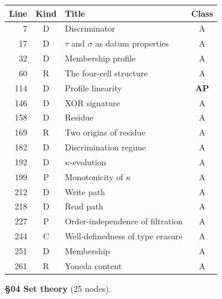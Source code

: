 \begin{center}
\scriptsize
\begin{tabular}{r|c|l|c}
\textbf{Line} & \textbf{Kind} & \textbf{Title} & \textbf{Class} \\
\hline
7 & \textsf{D} & Discriminator & A \\
17 & \textsf{D} & $\tau$ and $\sigma$ as datum properties & A \\
32 & \textsf{D} & Membership profile & A \\
60 & \textsf{R} & The four-cell structure & A \\
114 & \textsf{D} & Profile linearity & \textbf{AP} \\
146 & \textsf{D} & XOR signature & A \\
158 & \textsf{D} & Residue & A \\
169 & \textsf{R} & Two origins of residue & A \\
182 & \textsf{D} & Discrimination regime & A \\
192 & \textsf{D} & $\kappa$-evolution & A \\
199 & \textsf{P} & Monotonicity of $\kappa$ & A \\
212 & \textsf{D} & Write path & A \\
218 & \textsf{D} & Read path & A \\
227 & \textsf{P} & Order-independence of filtration & A \\
244 & \textsf{C} & Well-definedness of type erasure & A \\
251 & \textsf{D} & Membership & A \\
261 & \textsf{R} & Yoneda content & A \\
\end{tabular}
\end{center}

\medskip
\noindent\textbf{\S04 Set theory} (25 nodes).

